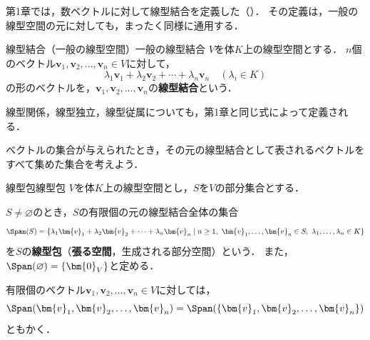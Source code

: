 第1章では，数ベクトルに対して線型結合を定義した（）．
その定義は，一般の線型空間の元に対しても，まったく同様に通用する．

\begin{definition}{線型結合（一般の線型空間）}{一般の線型結合}
  $V$を体$K$上の線型空間とする．
  $n$個のベクトル$\bm{v}_1, \bm{v}_2, \dots, \bm{v}_n \in V$に対して，
  \[
    \lambda_1 \bm{v}_1 + \lambda_2 \bm{v}_2 + \cdots + \lambda_n \bm{v}_n
    \quad (\lambda_i \in K)
  \]
  の形のベクトルを，$\bm{v}_1, \bm{v}_2, \dots, \bm{v}_n$の\textbf{線型結合}という．

  線型関係，線型独立，線型従属についても，第1章と同じ式によって定義される．
\end{definition}

ベクトルの集合が与えられたとき，その元の線型結合として表されるベクトルをすべて集めた集合を考えよう．

\begin{definition}{線型包}{線型包}
  $V$を体$K$上の線型空間とし，$S$を$V$の部分集合とする．

  $S \neq \varnothing$のとき，$S$の有限個の元の線型結合全体の集合
  \[
    \Span(S)
    = \{ \lambda_1 \bm{v}_1 + \lambda_2 \bm{v}_2 + \cdots + \lambda_n \bm{v}_n \mid n \ge 1,\ \bm{v}_1, \dots, \bm{v}_n \in S,\ \lambda_1, \dots, \lambda_n \in K \}
  \]
  を$S$の\textbf{線型包}（\textbf{張る空間}，生成される部分空間）という．
  また，$\Span(\varnothing) = \{\bm{0}_V\}$と定める．

  有限個のベクトル$\bm{v}_1, \bm{v}_2, \dots, \bm{v}_n \in V$に対しては，
  \[
    \Span(\bm{v}_1, \bm{v}_2, \dots, \bm{v}_n) = \Span(\{\bm{v}_1, \bm{v}_2, \dots, \bm{v}_n\})
  \]
  ともかく．
\end{definition}

